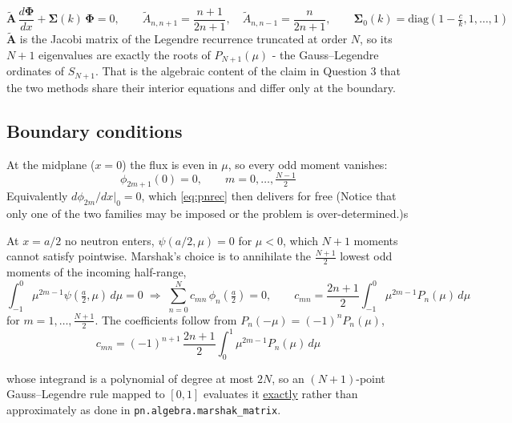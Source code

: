 \documentclass[11pt]{article}
\begin{document}
\begin{equation}
    \mathbf{\tilde A}\,\frac{d\boldsymbol{\Phi}}{dx} + \mathbf{\Sigma}(k)\,\boldsymbol{\Phi} = 0,
    \qquad
    \tilde A_{n,n+1}=\frac{n+1}{2n+1},\quad \tilde A_{n,n-1}=\frac{n}{2n+1},
    \qquad
    \mathbf{\Sigma}_0(k)=\text{diag}\!\left(1-\tfrac{c}{k},1,\dots,1\right)
    \label{eq:pnmatrix}
\end{equation}
$\mathbf{\tilde A}$ is the Jacobi matrix of the Legendre recurrence truncated at order $N$, so
its $N+1$ eigenvalues are exactly the roots of $P_{N+1}(\mu)$ - the Gauss--Legendre ordinates
of $S_{N+1}$. That is the algebraic content of the claim in Question 3 that the two methods share
their interior equations and differ only at the boundary.

\subsection*{Boundary conditions}

At the midplane ($x=0$) the flux is even in $\mu$, so every odd moment vanishes:
\begin{equation}
    \phi_{2m+1}(0) = 0, \qquad m=0,\dots,\tfrac{N-1}{2}
    \label{eq:pnsym}
\end{equation}
Equivalently $d\phi_{2m}/dx|_{0}=0$, which \eqref{eq:pnrec} then delivers for free (Notice that only one of
the two families may be imposed or the problem is over-determined.)s

At $x=a/2$ no neutron enters, $\psi(a/2,\mu)=0$ for $\mu<0$, which $N+1$ moments cannot satisfy
pointwise. Marshak's choice is to annihilate the $\tfrac{N+1}{2}$ lowest odd moments of the
incoming half-range,
\begin{equation}
    \int_{-1}^{0}\mu^{2m-1}\psi(\tfrac{a}{2},\mu)\,d\mu = 0
    \;\Longrightarrow\;
    \sum_{n=0}^{N} c_{mn}\,\phi_n(\tfrac{a}{2}) = 0,
    \qquad
    c_{mn} = \frac{2n+1}{2}\int_{-1}^{0}\mu^{2m-1}P_n(\mu)\,d\mu
    \label{eq:marshak}
\end{equation}
for $m=1,\dots,\tfrac{N+1}{2}$. The coefficients follow from
$P_n(-\mu)=(-1)^nP_n(\mu)$,
\begin{equation}
    c_{mn} = (-1)^{n+1}\,\frac{2n+1}{2}\int_{0}^{1}\mu^{2m-1}P_n(\mu)\,d\mu
\end{equation}
\begin{sloppypar}
whose integrand is a polynomial of degree at most $2N$, so an $(N+1)$-point Gauss--Legendre
rule mapped to $[0,1]$ evaluates it \uline{exactly} rather than approximately as done in \texttt{pn.algebra.marshak\_matrix}.
\end{sloppypar}
\end{document}
